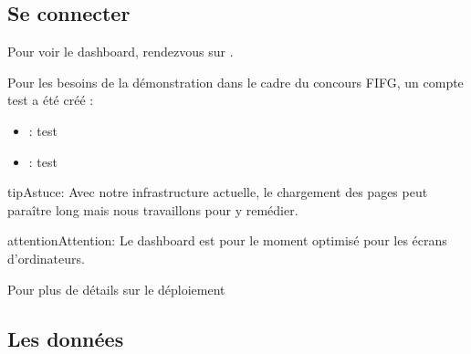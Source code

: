 \documentclass[letterpaper,10pt,french]{sphinxmanual}
\begin{document}
\subsection{Se connecter}
\label{\detokenize{intro:se-connecter}}
\sphinxAtStartPar
Pour voir le dashboard, rendez\sphinxhyphen{}vous sur  .

\sphinxAtStartPar
Pour les besoins de la démonstration dans le cadre du concours FIFG, un compte test a été créé :
\begin{itemize}
\item {} 
\sphinxAtStartPar
{}: test

\item {} 
\sphinxAtStartPar
{}: test

\end{itemize}

\begin{sphinxadmonition}{tip}{Astuce:}
\sphinxAtStartPar
Avec notre infrastructure actuelle, le chargement des pages peut paraître long mais nous travaillons pour y remédier.
\end{sphinxadmonition}

\begin{sphinxadmonition}{attention}{Attention:}
\sphinxAtStartPar
Le dashboard est pour le moment optimisé pour les écrans d’ordinateurs.
\end{sphinxadmonition}

\sphinxAtStartPar
Pour plus de détails sur le déploiement {\hyperref[\detokenize{use:instal}]{}}


\subsection{Les données}
\label{\detokenize{intro:les-donnees}}
\end{document}
